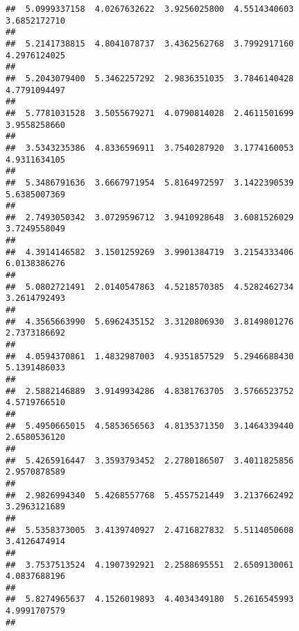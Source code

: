\documentclass[]{article}
\begin{document}
\begin{verbatim}
##  5.0999337158  4.0267632622  3.9256025800  4.5514340603  3.6852172710 
##                                                                       
##  5.2141738815  4.8041078737  3.4362562768  3.7992917160  4.2976124025 
##                                                                       
##  5.2043079400  5.3462257292  2.9836351035  3.7846140428  4.7791094497 
##                                                                       
##  5.7781031528  3.5055679271  4.0790814028  2.4611501699  3.9558258660 
##                                                                       
##  3.5343235386  4.8336596911  3.7540287920  3.1774160053  4.9311634105 
##                                                                       
##  5.3486791636  3.6667971954  5.8164972597  3.1422390539  5.6385007369 
##                                                                       
##  2.7493050342  3.0729596712  3.9410928648  3.6081526029  3.7249558049 
##                                                                       
##  4.3914146582  3.1501259269  3.9901384719  3.2154333406  6.0138386276 
##                                                                       
##  5.0802721491  2.0140547863  4.5218570385  4.5282462734  3.2614792493 
##                                                                       
##  4.3565663990  5.6962435152  3.3120806930  3.8149801276  2.7373186692 
##                                                                       
##  4.0594370861  1.4832987003  4.9351857529  5.2946688430  5.1391486033 
##                                                                       
##  2.5882146889  3.9149934286  4.8381763705  3.5766523752  4.5719766510 
##                                                                       
##  5.4950665015  4.5853656563  4.8135371350  3.1464339440  2.6580536120 
##                                                                       
##  5.4265916447  3.3593793452  2.2780186507  3.4011825856  2.9570878589 
##                                                                       
##  2.9826994340  5.4268557768  5.4557521449  3.2137662492  3.2963121689 
##                                                                       
##  5.5358373005  3.4139740927  2.4716827832  5.5114050608  3.4126474914 
##                                                                       
##  3.7537513524  4.1907392921  2.2588695551  2.6509130061  4.0837688196 
##                                                                       
##  5.8274965637  4.1526019893  4.4034349180  5.2616545993  4.9991707579 
##                                                                       

\end{verbatim}
\end{document}
